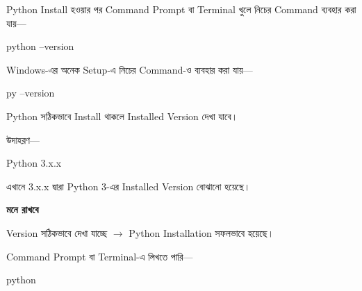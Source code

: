 
Python Install হওয়ার পর Command Prompt বা Terminal খুলে
নিচের Command ব্যবহার করা যায়—

\begin{codebox}

\begin{english}
\ttfamily
python --version
\end{english}

\end{codebox}

Windows-এর অনেক Setup-এ নিচের Command-ও ব্যবহার করা যায়—

\begin{codebox}

\begin{english}
\ttfamily
py --version
\end{english}

\end{codebox}

Python সঠিকভাবে Install থাকলে Installed Version দেখা যাবে।

উদাহরণ—

\begin{codebox}

\begin{english}
\ttfamily
Python 3.x.x
\end{english}

\end{codebox}

এখানে
\textenglish{\ttfamily 3.x.x}
দ্বারা Python 3-এর Installed Version বোঝানো হয়েছে।

\begin{rememberbox}

\textbf{\color{deepOrange}মনে রাখবে}

Version সঠিকভাবে দেখা যাচ্ছে
\(\longrightarrow\)
Python Installation সফলভাবে হয়েছে।

\end{rememberbox}



Command Prompt বা Terminal-এ লিখতে পারি—

\begin{codebox}

\begin{english}
\ttfamily
python
\end{english}

\end{codebox}


